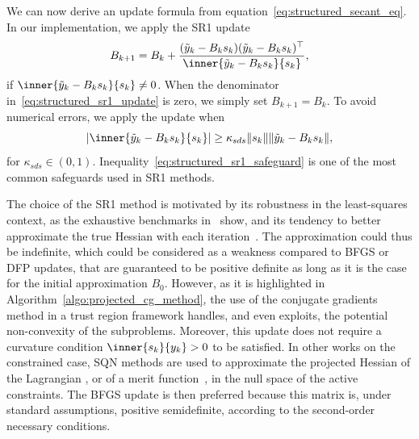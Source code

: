 We can now derive an update formula from equation~\eqref{eq:structured_secant_eq}. In our implementation, we apply the SR1 update
\begin{equation}\label{eq:structured_sr1_update}
	B_{k+1} = B_k + \dfrac{(\tilde{y}_k-B_ks_k)(\tilde{y}_k-B_ks_k)^\top}{\inner{\tilde{y}_k-B_ks_k}{s_k}},
\end{equation}
if $\inner{\tilde{y}_k-B_ks_k}{s_k} \neq 0$. When the denominator in~\eqref{eq:structured_sr1_update} is zero, we simply set $B_{k+1}=B_k$. To avoid numerical errors, we apply the update when
\begin{equation}\label{eq:structured_sr1_safeguard}
	\left|\inner{\tilde{y}_k-B_ks_k}{s_k}\right| \ge \kappa_{sds}\|s_k\|\|\tilde{y}_k-B_ks_k\|,
\end{equation}
for $\kappa_{sds} \in (0,1)$. Inequality~\eqref{eq:structured_sr1_safeguard} is one of the most common safeguards used in SR1 methods. 

The choice of the SR1 method is motivated by its robustness in the least-squares context, as the exhaustive benchmarks in~\cite{lucksan-etal:2019} show, and its tendency to better approximate the true Hessian with each iteration~\cite{conn-etal:1991a}. The approximation could thus be indefinite, which could be considered as a weakness compared to BFGS or DFP updates, that are guaranteed to be positive definite as long as it is the case for the initial approximation $B_0$. However, as it is highlighted in Algorithm~\ref{algo:projected_cg_method}, the use of the conjugate gradients method in a trust region framework handles, and even exploits, the potential non-convexity of the subproblems. Moreover, this update does not require a curvature condition $\inner{s_k}{y_k} > 0$ to be satisfied. In other works on the constrained case, SQN methods are used to approximate the projected Hessian of the Lagrangian \cite{tjoabiegler:1991}, or of a merit function~\cite{amiribartels:1989}, in the null space of the active constraints. The BFGS update is then preferred because this matrix is, under standard assumptions, positive semidefinite, according to the second-order necessary conditions.

